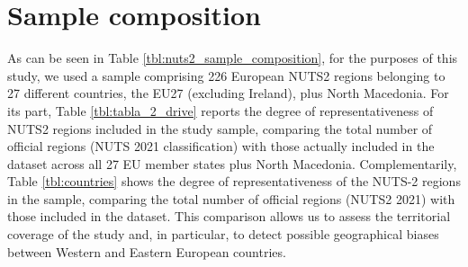 \documentclass[a4paper,11pt,oneside]{article}
\newcommand{\Emili}{\color{emili}}
\begin{document}
\section{Sample composition}
\label{sec:data}


As can be seen in Table \ref{tbl:nuts2_sample_composition}, for the purposes of this study, we used a sample comprising 226 European NUTS2 regions belonging to 27 different countries, the EU27 (excluding Ireland), plus North Macedonia. For its part, Table \ref{tbl:tabla_2_drive} reports the degree of representativeness of NUTS2 regions included in the study sample, comparing the total number of official regions (NUTS 2021 classification) with those actually included in the dataset across all 27 EU member states plus North Macedonia. Complementarily, Table \ref{tbl:countries} shows the degree of representativeness of the NUTS-2 regions in the sample, comparing the total number of official regions (NUTS2 2021) with those included in the dataset. This comparison allows us to assess the territorial coverage of the study and, in particular, to detect possible geographical biases between Western and Eastern European countries.



\end{document}
